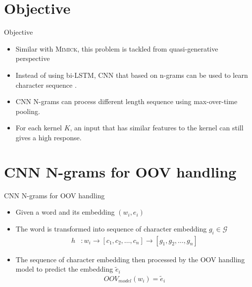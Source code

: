 \documentclass{beamer}
\begin{document}
\section{Objective}
\begin{frame}{Objective}
    \begin{itemize}
        \item Similar with \textsc{Mimick}, this problem is tackled
        from quasi-generative perspective
        \item Instead of using bi-LSTM, CNN that based on n-grams can
        be used to learn character sequence
        \cite{convolutional2014kim}.
        \item CNN N-grams can process different length sequence using
        max-over-time pooling.
        \item For each kernel $K$, an input that has similar features
        to the kernel can still gives a high response.
    \end{itemize}
\end{frame}

\section{CNN N-grams for OOV handling}
\begin{frame}{CNN N-grams for OOV handling}
    \begin{itemize}
        \item Given a word and its embedding $(w_i, e_i)$
        \item The word is transformed into sequence of character
        embedding $g_i \in \mathcal{G}$
        \begin{align*}
            h &: w_i \rightarrow [c_1, c_2,\dots, c_n] \rightarrow [g_1, g_2,\dots,g_n]
        \end{align*}
        \item The sequence of character embedding then processed by
        the OOV handling model to predict the embedding $\tilde{e}_i$
        \begin{align*}
            OOV_{model}(w_i) = \tilde{e}_i
        \end{align*}
    \end{itemize}
\end{frame}
\end{document}

